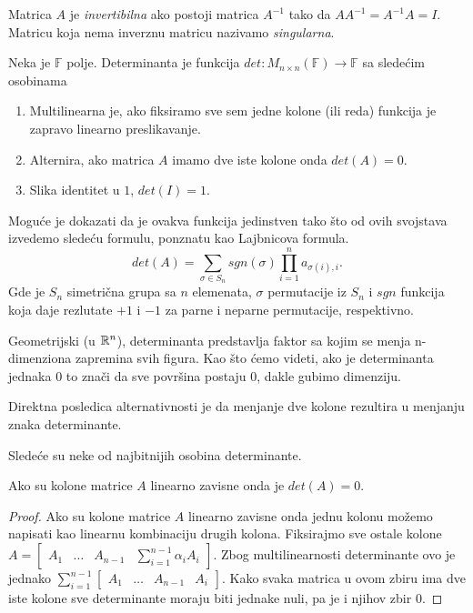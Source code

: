 \documentclass{article}
\begin{document}
\begin{definition}[Invertibilnost]
  Matrica $A$ je \textit{invertibilna} ako postoji matrica $A^{-1}$ tako da $AA^{-1} = A^{-1}A = I$.
  Matricu koja nema inverznu matricu nazivamo \textit{singularna}.
\end{definition}

\begin{definition}[Determinanta]
  Neka je $\mathbb{F}$ polje.
  Determinanta je funkcija $det : M_{n \times n} (\mathbb{F}) \to \mathbb{F}$ sa sledećim osobinama
  \begin{enumerate}
    \item Multilinearna je, ako fiksiramo sve sem jedne kolone (ili reda) funkcija je zapravo linearno preslikavanje.
    \item Alternira, ako matrica $A$ imamo dve iste kolone onda $det(A) = 0$.
    \item Slika identitet u $1$, $det(I) = 1$.
  \end{enumerate}

  Moguće je dokazati da je ovakva funkcija jedinstven tako što od ovih svojstava izvedemo sledeću formulu, ponznatu kao Lajbnicova formula.
  \[det(A) = \sum_{\sigma \in S_n} sgn(\sigma) \prod_{i = 1}^{n} a_{\sigma(i), i}.\]
  Gde je $S_n$ simetrična grupa sa $n$ elemenata, $\sigma$ permutacije iz $S_n$ i $sgn$ funkcija koja daje rezlutate $+1$ i $-1$ za parne i neparne permutacije, respektivno.
\end{definition}

Geometrijski (u $\mathbb{R}^n$), determinanta predstavlja faktor sa kojim se menja n-dimenziona zapremina svih figura.
Kao što ćemo videti, ako je determinanta jednaka $0$ to znači da sve površina postaju $0$, dakle gubimo dimenziju.

Direktna posledica alternativnosti je da menjanje dve kolone rezultira u menjanju znaka determinante.

Sledeće su neke od najbitnijih osobina determinante.

\begin{theorem}
  Ako su kolone matrice $A$ linearno zavisne onda je $det(A) = 0$.
\end{theorem}

\begin{proof}
  Ako su kolone matrice $A$ linearno zavisne onda jednu kolonu možemo napisati kao linearnu kombinaciju drugih kolona.
  Fiksirajmo sve ostale kolone $A = \begin{bmatrix} A_1 & \ldots & A_{n - 1} & \sum_{i = 1}^{n - 1} \alpha_i A_i \end{bmatrix}$.
  Zbog multilinearnosti determinante ovo je jednako $\sum_{i = 1}^{n - 1} \begin{bmatrix} A_1 & \ldots & A_{n - 1} & A_i \end{bmatrix}$.
  Kako svaka matrica u ovom zbiru ima dve iste kolone sve determinante moraju biti jednake nuli, pa je i njihov zbir 0.
\end{proof}
\end{document}

